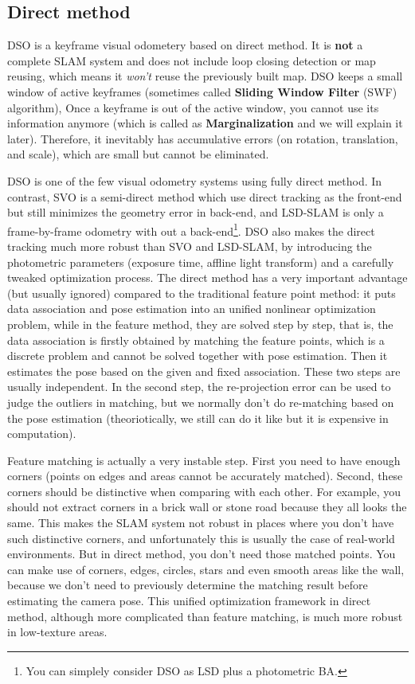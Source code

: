 \documentclass[a4paper,10pt]{article}
\begin{document}
	\subsection{Direct method}
	DSO is a keyframe visual odometery based on direct method. It is \textbf{not} a complete SLAM system and does not include loop closing detection or map reusing, which means it \emph{won't} reuse the previously built map. DSO keeps a small window of active keyframes (sometimes called \textbf{Sliding Window Filter} (SWF) algorithm), Once a keyframe is out of the active window, you cannot use its information anymore (which is called as \textbf{Marginalization} and we will explain it later). Therefore, it inevitably has accumulative errors (on rotation, translation, and scale), which are small but cannot be eliminated. 
	
	DSO is one of the few visual odometry systems using fully direct method. In contrast, SVO \cite{forster2014svo} is a semi-direct method which use direct tracking as the front-end but still minimizes the geometry error in back-end, and LSD-SLAM \cite{engel2014lsd} is only a frame-by-frame odometry with out a back-end\footnote{You can simplely consider DSO as LSD plus a photometric BA.}. DSO also makes the direct tracking much more robust than SVO and LSD-SLAM, by introducing the photometric parameters (exposure time, affline light transform) and a carefully tweaked optimization process. The direct method has a very important advantage (but usually ignored) compared to the traditional feature point method: it puts data association and pose estimation into an unified nonlinear optimization problem, while in the feature method, they are solved step by step, that is, the data association is firstly obtained by matching the feature points, which is a discrete problem and cannot be solved together with pose estimation. Then it estimates the pose based on the given and fixed association. These two steps are usually independent. In the second step, the re-projection error can be used to judge the outliers in matching, but we normally don't do re-matching based on the pose estimation (theoriotically, we still can do it like \cite{bowman2017probabilistic} but it is expensive in computation). 
	
	Feature matching is actually a very instable step. First you need to have enough corners (points on edges and areas cannot be accurately matched). Second, these corners should be distinctive when comparing with each other. For example, you should not extract corners in a brick wall or stone road because they all looks the same. This makes the SLAM system not robust in places where you don't have such distinctive corners, and unfortunately this is usually the case of real-world environments. But in direct method, you don't need those matched points. You can make use of corners, edges, circles, stars and even smooth areas like the wall, because we don't need to previously determine the matching result before estimating the camera pose. This unified optimization framework in direct method, although more complicated than feature matching, is much more robust in low-texture areas. 
	
\end{document}
